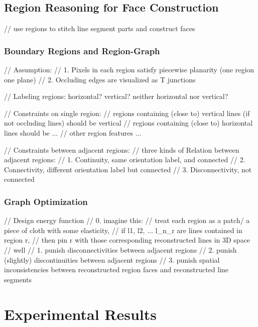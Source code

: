 \documentclass[runningheads]{llncs}
\begin{document}
\subsection{Region Reasoning for Face Construction}

// use regions to stitch line segment parts and construct faces

\subsubsection {Boundary Regions and Region-Graph} %

// Assumption:
// 1. Pixels in each region satisfy piecewise planarity (one region one plane)
// 2. Occluding edges are visualized as T junctions

// Labeling regions: horizontal? vertical? neither horizontal nor vertical?


// Constraints on single region:
//  regions containing (close to) vertical lines (if not occluding lines) should be vertical 
//  regions containing (close to) horizontal lines should be ...
//	other region features ...

// Constraints between adjacent regions:
//   three kinds of Relation between adjacent regions:
//   1. Continuity, same orientation label, and connected
//   2. Connectivity, different orientation label but connected
//   3. Disconnectivity, not connected



\subsubsection {Graph Optimization}

// Design energy function
//  0. imagine this:
//       treat each region as a patch/ a piece of cloth with some elasticity, 
//       if l1, l2, ... l_{n_r} are lines contained in region r,
//       then pin r with those corresponding reconstructed lines in 3D space
//       well 
//  1. punish disconnectivities between adjacent regions
//  2. punish (slightly) discontinuities between adjacent regions
//  3. punish spatial inconsistencies between reconstructed region faces and reconstructed line segments

\section{Experimental Results}
\end{document}
